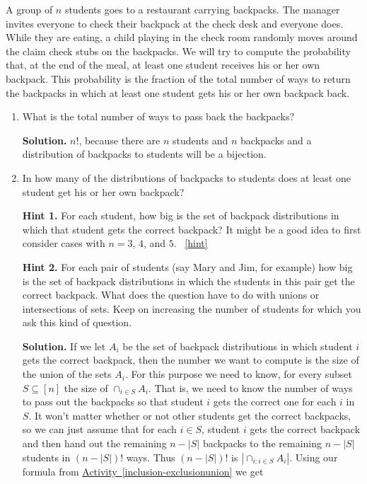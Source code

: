 \documentclass{book}
\begin{document}
\setcounter{project}{222}
\addtocounter{project}{-1}
\begin{activity}[]\label{hatcheck}
\hypertarget{p-1224}{}%
A group of \(n\) students goes to a restaurant carrying backpacks. The manager invites everyone to check their backpack at the check desk and everyone does. While they are eating, a child playing in the check room randomly moves around the claim check stubs on the backpacks. We will try to compute the probability that, at the end of the meal, at least one student receives his or her own backpack.  This probability is the fraction of the total number of ways to return the backpacks in which at least one student gets his or her own backpack back.%
\begin{enumerate}[font=\bfseries,label=(\alph*),ref=\alph*]
\item\label{task-228} \hypertarget{p-1225}{}%
What is the total number of ways to pass back the backpacks?%
\par\smallskip%
\noindent\textbf{Solution.}\hypertarget{solution-139}{}\quad%
\hypertarget{p-1226}{}%
\(n!\), because there are \(n\) students and \(n\) backpacks and a distribution of backpacks to students will be a bijection.%
\item\label{task-229} \hypertarget{p-1227}{}%
In how many of the distributions of backpacks to students does at least one student get his or her own backpack?%
\par\smallskip%
\noindent\textbf{Hint 1.}\hypertarget{hint-141}{}\quad%
\hypertarget{p-1228}{}%
For each student, how big is the set of backpack distributions in which that student gets the correct backpack?  It might be a good idea to first consider cases with \(n=3\), \(4\), and \(5\).%
~\hfill{\tiny\hyperlink{a-222.b}{[hint]}\hypertarget{q-222.b}{}}\par\smallskip%
\noindent\textbf{Hint 2.}\hypertarget{hint-142}{}\quad%
\hypertarget{p-1229}{}%
For each pair of students (say Mary and Jim, for example) how big is the set of backpack distributions in which the students in this pair get the correct backpack. What does the question have to do with unions or intersections of sets. Keep on increasing the number of students for which you ask this kind of question.%
\par\smallskip%
\noindent\textbf{Solution.}\hypertarget{solution-140}{}\quad%
\hypertarget{p-1230}{}%
If we let \(A_i\) be the set of backpack distributions in which student \(i\) gets the correct backpack, then the number we want to compute is the size of the union of the sets \(A_i\). For this purpose we need to know, for every subset \(S\subseteq [n]\) the size of \(\cap_{i\in S}A_i\). That is, we need to know the number of ways to pass out the backpacks so that student \(i\) gets the correct one for each \(i\) in \(S\). It won't matter whether or not other students get the correct backpacks, so we can just assume that for each \(i\in S\), student \(i\) gets the correct backpack and then hand out the remaining \(n-|S|\) backpacks to the remaining \(n-|S|\) students in \((n-|S|)!\) ways. Thus \((n-|S|)!\) is \(|\cap_{i:i\in S}A_i|\). Using our formula from \hyperref[inclusion-exclusionunion]{Activity~\ref{inclusion-exclusionunion}} we get%

\end{enumerate}
\end{activity}
\end{document}
